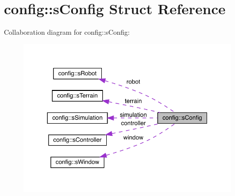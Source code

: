 \hypertarget{structconfig_1_1s_config}{}\section{config\+:\+:s\+Config Struct Reference}
\label{structconfig_1_1s_config}


Collaboration diagram for config\+:\+:s\+Config\+:\nopagebreak
\begin{figure}[H]
\begin{center}
\leavevmode
\includegraphics[width=346pt]{structconfig_1_1s_config__coll__graph}
\end{center}
\end{figure}
